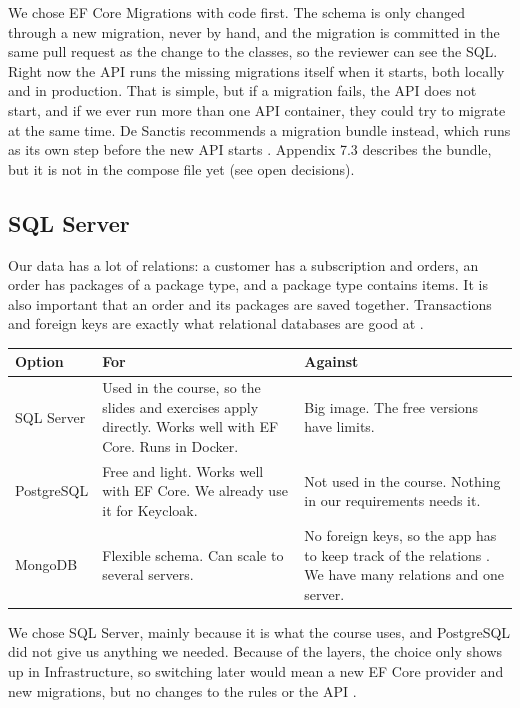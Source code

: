 \documentclass[a4paper,11pt]{article}
\begin{document}
We chose EF Core Migrations with code first. The schema is only changed through a new migration, never by hand, and the migration is committed in the same pull request as the change to the classes, so the reviewer can see the SQL. Right now the API runs the missing migrations itself when it starts, both locally and in production. That is simple, but if a migration fails, the API does not start, and if we ever run more than one API container, they could try to migrate at the same time. De Sanctis recommends a migration bundle instead, which runs as its own step before the new API starts \cite[sec.~12.4.4, p.~421]{desanctis-web-apis-aspnet-core}. Appendix 7.3 describes the bundle, but it is not in the compose file yet (see open decisions).

\subsection{SQL Server}
Our data has a lot of relations: a customer has a subscription and orders, an order has packages of a package type, and a package type contains items. It is also important that an order and its packages are saved together. Transactions and foreign keys are exactly what relational databases are good at \cite[secs.~4.1 and 4.1.1]{desanctis-web-apis-aspnet-core}.
\begin{center}
\begin{tabular}{@{}p{3.1cm} p{5.6cm} p{5.6cm}@{}}
\textbf{Option} & \textbf{For} & \textbf{Against} \\
\hline
SQL Server & Used in the course, so the slides and exercises apply directly. Works well with EF Core. Runs in Docker. & Big image. The free versions have limits. \\
\hline
PostgreSQL & Free and light. Works well with EF Core. We already use it for Keycloak. & Not used in the course. Nothing in our requirements needs it. \\
\hline
MongoDB & Flexible schema. Can scale to several servers. & No foreign keys, so the app has to keep track of the relations \cite{mongodb-data-consistency}. We have many relations and one server. \\
\hline
\end{tabular}
\end{center}

We chose SQL Server, mainly because it is what the course uses, and PostgreSQL did not give us anything we needed. Because of the layers, the choice only shows up in Infrastructure, so switching later would mean a new EF Core provider and new migrations, but no changes to the rules or the API \cite[secs.~4.1.2 and 4.3.1]{desanctis-web-apis-aspnet-core}.
\end{document}
